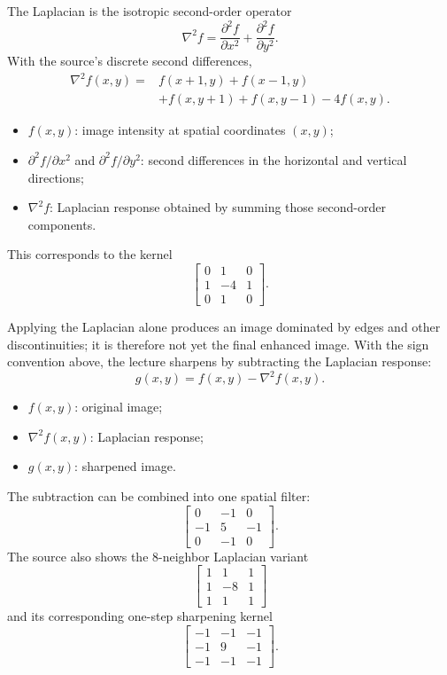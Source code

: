 \documentclass[11pt,a4paper,oneside]{report}
\newcommand{\mathlegend}[1]{%
  \par\vspace{0.2em}{\small\itshape where}\par
  \begin{itemize}[leftmargin=1.7em,topsep=0.15em,itemsep=0.12em]
  #1
  \end{itemize}
}
\begin{document}
The Laplacian is the isotropic second-order operator
\begin{equation}
  \nabla^2 f=\frac{\partial^2f}{\partial x^2}+\frac{\partial^2f}{\partial y^2}.
  \label{eq:laplacian-definition}
\end{equation}
With the source's discrete second differences,
\begin{equation}
\begin{aligned}
\nabla^2f(x,y)={}&f(x+1,y)+f(x-1,y)\\
&+f(x,y+1)+f(x,y-1)-4f(x,y).
\end{aligned}
\label{eq:laplacian-discrete}
\end{equation}
\mathlegend{
  \item $f(x,y)$: image intensity at spatial coordinates $(x,y)$;
  \item $\partial^2f/\partial x^2$ and $\partial^2f/\partial y^2$: second differences in the horizontal and vertical directions;
  \item $\nabla^2f$: Laplacian response obtained by summing those second-order components.
}
This corresponds to the kernel
\[
\begin{bmatrix}
0&1&0\\
1&-4&1\\
0&1&0
\end{bmatrix}.
\]

Applying the Laplacian alone produces an image dominated by edges and other discontinuities; it is therefore not yet the final enhanced image. With the sign convention above, the lecture sharpens by subtracting the Laplacian response:
\begin{equation}
  g(x,y)=f(x,y)-\nabla^2f(x,y).
  \label{eq:laplacian-sharpen}
\end{equation}
\mathlegend{
  \item $f(x,y)$: original image;
  \item $\nabla^2f(x,y)$: Laplacian response;
  \item $g(x,y)$: sharpened image.
}

The subtraction can be combined into one spatial filter:
\[
\begin{bmatrix}
0&-1&0\\
-1&5&-1\\
0&-1&0
\end{bmatrix}.
\]
The source also shows the 8-neighbor Laplacian variant
\[
\begin{bmatrix}
1&1&1\\
1&-8&1\\
1&1&1
\end{bmatrix}
\]
and its corresponding one-step sharpening kernel
\[
\begin{bmatrix}
-1&-1&-1\\
-1&9&-1\\
-1&-1&-1
\end{bmatrix}.
\]
\end{document}
